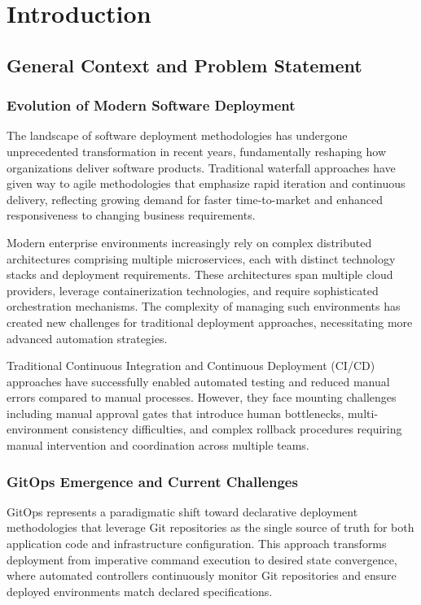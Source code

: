 \chapter{Introduction}

\section{General Context and Problem Statement}

\subsection{Evolution of Modern Software Deployment}
The landscape of software deployment methodologies has undergone unprecedented transformation in recent years, fundamentally reshaping how organizations deliver software products. Traditional waterfall approaches have given way to agile methodologies that emphasize rapid iteration and continuous delivery, reflecting growing demand for faster time-to-market and enhanced responsiveness to changing business requirements.

Modern enterprise environments increasingly rely on complex distributed architectures comprising multiple microservices, each with distinct technology stacks and deployment requirements. These architectures span multiple cloud providers, leverage containerization technologies, and require sophisticated orchestration mechanisms. The complexity of managing such environments has created new challenges for traditional deployment approaches, necessitating more advanced automation strategies.

Traditional Continuous Integration and Continuous Deployment (CI/CD) approaches have successfully enabled automated testing and reduced manual errors compared to manual processes. However, they face mounting challenges including manual approval gates that introduce human bottlenecks, multi-environment consistency difficulties, and complex rollback procedures requiring manual intervention and coordination across multiple teams.

\subsection{GitOps Emergence and Current Challenges}
GitOps represents a paradigmatic shift toward declarative deployment methodologies that leverage Git repositories as the single source of truth for both application code and infrastructure configuration. This approach transforms deployment from imperative command execution to desired state convergence, where automated controllers continuously monitor Git repositories and ensure deployed environments match declared specifications.

